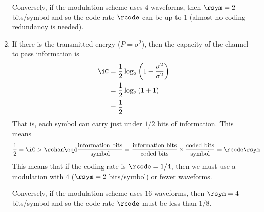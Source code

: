 \begin{example}
\begin{enumerate}
  Conversely, if the modulation scheme uses $4$ waveforms, then
  $\rsym=2$ bits/symbol and so the code rate $\rcode$ can be
  up to $1$ (almost no coding redundancy is needed).


  \item If there is the transmitted energy ($P=\sigma^2$),
        then the capacity of the channel to pass information is
    \begin{align*}
      \iC
        &= \frac{1}{2}\log_2\left( 1 + \frac{\sigma^2}{\sigma^2}\right)
      \\&= \frac{1}{2}\log_2\left( 1 + 1\right)
      \\&= \frac{1}{2}
    \end{align*}
  That is, each symbol can carry just under $1/2$ bits of information.
  This means
  \begin{align*}
    \frac{1}{2}
      &= \iC
       >  \rchan
       \eqd \frac{\mbox{information bits}}{\mbox{symbol}}
       = \frac{\mbox{information bits}}{\mbox{coded bits}} \times
         \frac{\mbox{coded bits}}{\mbox{symbol}}
       = \rcode \rsym
  \end{align*}
  This means that if the coding rate is $\rcode=1/4$,
  then we must use a modulation with $4$ ($\rsym=2$ bits/symbol)
  or fewer waveforms.

  Conversely, if the modulation scheme uses $16$ waveforms, then
  $\rsym=4$ bits/symbol and so the code rate $\rcode$ must be
  less than $1/8$.
\end{enumerate}
\end{example}




